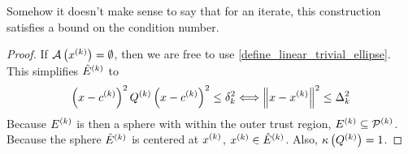 \begin{boxedcomment}
Somehow it doesn't make sense to say that for an iterate, this construction satisfies a bound on the condition number.
\end{boxedcomment}

\begin{proof}
If ${\mathcal A}\left(x^{(k)}\right) = \emptyset$, then we are free to use \cref{define_linear_trivial_ellipse}.
This simplifies ${{\hat E}^{(k)}}$ to
\begin{align*}
\left(x - c^{(k)}\right)^2 {Q^{(k)}} \left(x - c^{(k)}\right)^2 \le \delta_k^2 \Longleftrightarrow \left\|x - x^{(k)}\right\|^2 \le \Delta_k^2
\end{align*}
Because ${E^{(k)}}$ is then a sphere with within the outer trust region, ${E^{(k)}} \subseteq {{\mathcal{P}}^{(k)}}$.
Because the sphere ${{\hat E}^{(k)}}$ is centered at $x^{(k)}$, $x^{(k)} \in {{\hat E}^{(k)}}$.
Also, ${\kappa}\left({Q^{(k)}}\right) = 1$.
\end{proof}



